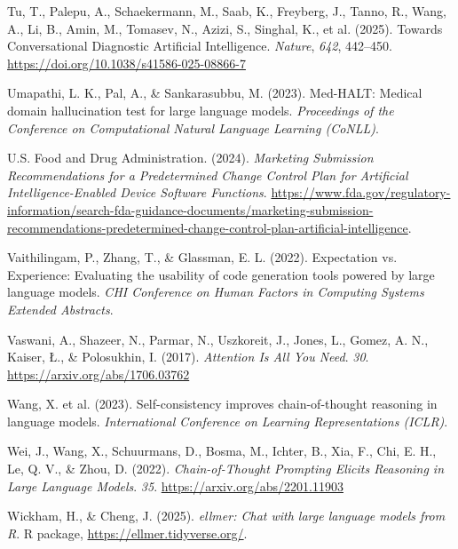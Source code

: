 \documentclass[
  letterpaper,
  11pt]{scrbook}
\newlength{\cslhangindent}
\newenvironment{CSLReferences}[2] %
 {\begin{list}{}{%
  \setlength{\itemindent}{0pt}
  \setlength{\leftmargin}{0pt}
  \setlength{\parsep}{0pt}
  \ifodd #1
   \setlength{\leftmargin}{\cslhangindent}
   \setlength{\itemindent}{-1\cslhangindent}
  \fi
  \setlength{\itemsep}{#2\baselineskip}}}
 {\end{list}}
\begin{document}
\begin{CSLReferences}{1}{0}
{Tu, T., Palepu, A., Schaekermann, M., Saab, K., Freyberg, J., Tanno,
R., Wang, A., Li, B., Amin, M., Tomasev, N., Azizi, S., Singhal, K., et
al.} (2025). {Towards Conversational Diagnostic Artificial
Intelligence}. \emph{Nature}, \emph{642}, 442--450.
\url{https://doi.org/10.1038/s41586-025-08866-7}

Umapathi, L. K., Pal, A., \& Sankarasubbu, M. (2023). {Med-HALT}:
Medical domain hallucination test for large language models.
\emph{Proceedings of the Conference on Computational Natural Language
Learning (CoNLL)}.

U.S. Food and Drug Administration. (2024). \emph{{Marketing Submission
Recommendations for a Predetermined Change Control Plan for Artificial
Intelligence-Enabled Device Software Functions}}.
\url{https://www.fda.gov/regulatory-information/search-fda-guidance-documents/marketing-submission-recommendations-predetermined-change-control-plan-artificial-intelligence}.

Vaithilingam, P., Zhang, T., \& Glassman, E. L. (2022). Expectation vs.
Experience: Evaluating the usability of code generation tools powered by
large language models. \emph{CHI Conference on Human Factors in
Computing Systems Extended Abstracts}.

Vaswani, A., Shazeer, N., Parmar, N., Uszkoreit, J., Jones, L., Gomez,
A. N., Kaiser, Ł., \& Polosukhin, I. (2017). \emph{{Attention Is All You
Need}}. \emph{30}. \url{https://arxiv.org/abs/1706.03762}

{Wang, X. et al.} (2023). Self-consistency improves chain-of-thought
reasoning in language models. \emph{International Conference on Learning
Representations (ICLR)}.

Wei, J., Wang, X., Schuurmans, D., Bosma, M., Ichter, B., Xia, F., Chi,
E. H., Le, Q. V., \& Zhou, D. (2022). \emph{{Chain-of-Thought Prompting
Elicits Reasoning in Large Language Models}}. \emph{35}.
\url{https://arxiv.org/abs/2201.11903}

Wickham, H., \& Cheng, J. (2025). \emph{{ellmer}: Chat with large
language models from {R}}. R package,
\url{https://ellmer.tidyverse.org/}.


\end{CSLReferences}
\end{document}
